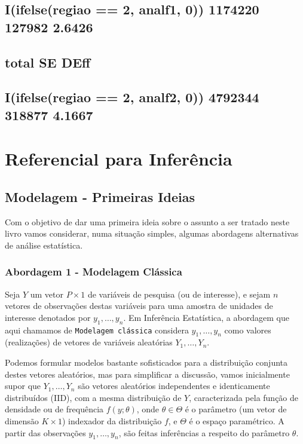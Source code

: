 \documentclass[]{book}
\theoremstyle{definition}
\theoremstyle{definition}
\theoremstyle{definition}
\theoremstyle{remark}
\begin{document}
\section{I(ifelse(regiao == 2, analf1, 0)) 1174220 127982
2.6426}\label{iifelseregiao-2-analf1-0-1174220-127982-2.6426}

\section{total SE DEff}\label{total-se-deff-5}

\section{I(ifelse(regiao == 2, analf2, 0)) 4792344 318877
4.1667}\label{iifelseregiao-2-analf2-0-4792344-318877-4.1667}

\chapter{Referencial para Inferência}\label{refinf}

\section{Modelagem - Primeiras Ideias}\label{classic}

Com o objetivo de dar uma primeira ideia sobre o assunto a ser tratado
neste livro vamos considerar, numa situação simples, algumas abordagens
alternativas de análise estatística.

\subsection{Abordagem 1 - Modelagem
Clássica}\label{abordagem-1---modelagem-classica}

Seja \(Y\) um vetor \(P \times 1\) de variáveis de pesquisa (ou de
interesse), e sejam \(n\) vetores de observações destas variáveis para
uma amostra de unidades de interesse denotados por \(y_1,\ldots ,y_n\).
Em Inferência Estatística, a abordagem que aqui chamamos de
\texttt{Modelagem\ clássica} considera \(y_1,\ldots ,y_n\) como valores
(realizações) de vetores de variáveis aleatórias \(Y_1,\ldots ,Y_n\).

Podemos formular modelos bastante sofisticados para a distribuição
conjunta destes vetores aleatórios, mas para simplificar a discussão,
vamos inicialmente supor que \(Y_1,\ldots ,Y_n\) são vetores aleatórios
independentes e identicamente distribuídos (IID), com a mesma
distribuição de \(Y\), caracterizada pela função de densidade ou de
frequência \(f(y;\theta)\), onde \(\theta \in \Theta\) é o parâmetro (um
vetor de dimensão \(K \times 1\)) indexador da distribuição \(f\), e
\(\Theta\) é o espaço paramétrico. A partir das observações
\(y_1,\ldots ,y_n\), são feitas inferências a respeito do parâmetro
\(\theta\).
\end{document}
